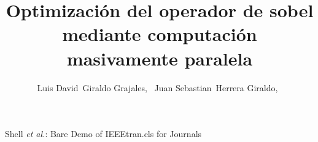 \documentclass[journal]{IEEEtran}
\begin{document}
%
\title{Optimizaci\'on del operador de sobel mediante computaci\'on masivamente paralela}
%
%
%

\author{Luis David~Giraldo Grajales,~
        Juan Sebastian~Herrera Giraldo,~
}

% 
%



%
{Shell \MakeLowercase{\textit{et al.}}: Bare Demo of IEEEtran.cls for Journals}
% 




\end{document}
